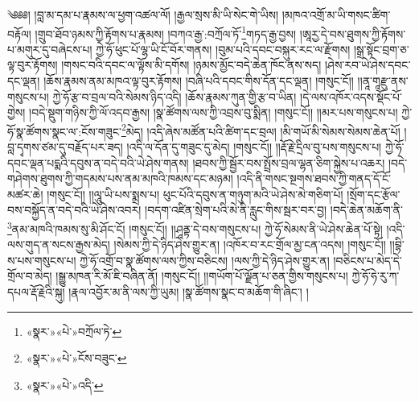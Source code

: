 ༄༅༅། །བླ་མ་དམ་པ་རྣམས་ལ་ཕྱག་འཚལ་ལོ། །རྒྱལ་སྲས་མི་ཡི་སེང་གེ་ཡིས། །མཁའ་འགྲོ་མ་ཡི་གསང་ཚིག་བརྟོལ། །གྲུབ་ཐོབ་ཉམས་ཀྱི་རྟོགས་པ་རྣམས། །བཀའ་རྒྱ་:བཀྲོལ་ཏོ་\footnote{«སྣར་»«པེ་»བཀྲོལ་ཏེ་}གཏད་རྒྱ་བྱས། །ཨཱརྱ་དེ་བས་ཐུགས་ཀྱི་རྟོགས་པ་མགུར་དུ་བཞེངས་པ། ཀྱེ་ཧོ་ཕུང་པོ་ལྷ་ཡི་ངོ་བོར་གནས། །བུམ་པའི་དབང་བསྐུར་རང་ལ་རྫོགས། །སྒྲ་སྟོང་བྲག་ཅ་ལྟ་བུར་རྟོགས། །གསང་བའི་དབང་ལ་ལྟོས་མི་དགོས། །ཉམས་མྱོང་བདེ་ཆེན་ཁོང་ནས་སད། །ཤེས་རབ་ཡེ་ཤེས་དབང་དང་ལྡན། །ཆོས་རྣམས་ནམ་མཁའ་ལྟ་བུར་རྟོགས། །བཞི་པའི་དབང་གིས་དོན་དང་ལྡན། །གསུང་ངོ།། །།ནཱ་གཱརྫུ་ནས་གསུངས་པ། ཀྱེ་ཧོ་རྩ་བ་བྲལ་བའི་སེམས་ཉིད་འདི། །ཆོས་རྣམས་ཀུན་གྱི་རྩ་བ་ཡིན། །དེ་ལས་འཁོར་འདས་སྡོང་པོ་གྱེས། །བདེ་སྡུག་གཉིས་ཀྱི་ལོ་འདབ་རྒྱས། །སྣ་ཚོགས་ལས་ཀྱི་འབྲས་བུ་སྨིན། །གསུང་ངོ།། །།མར་པས་གསུངས་པ། ཀྱེ་ཧོ་སྣ་ཚོགས་སྣང་ལ་:ངོས་གཟུང་\footnote{«སྣར་»«པེ་»ངོས་བཟུང་}མེད། །འདི་ཞེས་མཚོན་པའི་ཚིག་དང་བྲལ། །མི་གཡོ་མི་སེམས་སེམས་ཆེན་པོ། །བླ་དྭགས་ཙམ་དུ་བརྗོད་པར་ཟད། །འདི་ལ་དོན་དུ་གཟུང་དུ་མེད། །གསུང་ངོ།། །།རྡོ་རྗེ་དྲིལ་བུ་པས་གསུངས་པ། ཀྱེ་ཧོ་དབང་ལྡན་པདྨའི་དབུས་ན་བདེ་བའི་ཡེ་ཤེས་གནས། །ཐབས་ཀྱི་སྦྱོར་བས་སྤྲོས་བྲལ་ལྷན་ཅིག་སྐྱེས་པ་འཆར། །བདེ་གཤེགས་ཐུགས་ཀྱི་གདམས་པས་ནམ་མཁའི་ཁམས་དང་མཉམ། །འདི་ནི་གསང་སྔགས་ཐབས་ཀྱི་གནད་དོ་ངོ་མཚར་ཆེ། །གསུང་ངོ།། །།ལཱུ་ཡི་པས་སྨྲས་པ། ཕུང་པོའི་དབུས་ན་གཉུག་མའི་ཡེ་ཤེས་མེ་གཅིག་པོ། །སྲོག་དང་རྩོལ་བས་བསྐྱོད་ན་བདེ་བའི་ཡེ་ཤེས་འབར། །བདག་འཛིན་སྲེག་པའི་མེ་ནི་རླུང་གིས་སྦར་བར་བྱ། །བདེ་ཆེན་མཆོག་ནི་\footnote{«སྣར་»«པེ་»འདི་}ནམ་མཁའི་ཁམས་སུ་མི་ཤོང་ངོ། །གསུང་ངོ།། །།ཤཱནྟ་དེ་བས་གསུངས་པ། ཀྱེ་ཧོ་སེམས་ནི་ཡེ་ཤེས་ཆེན་པོ་སྟེ། །འདི་ལས་གུད་ན་སངས་རྒྱས་མེད། །སེམས་ཀྱི་དེ་ཉིད་ཤེས་གྱུར་ན། །འཁོར་བ་རང་གྲོལ་མྱ་ངན་འདས། །གསུང་ངོ།། །།བྷི་ས་པས་གསུངས་པ། ཀྱེ་ཧོ་འགྲོ་བ་སྣ་ཚོགས་ལས་ཀྱིས་བཅིངས། །ལས་ཀྱི་དེ་ཉིད་ཤེས་གྱུར་ན། །བཅིངས་པ་མེད་དེ་གྲོལ་བ་མེད། །སྒྱུ་མཁན་རི་མོ་ཇི་བཞིན་ནོ། །གསུང་ངོ།། །།གཡོག་པོ་ལྗོན་པ་ཅན་གྱིས་གསུངས་པ། ཀྱེ་ཧོ་ཧེ་རུ་ཀ་དཔལ་རྡོ་རྗེའི་སྐུ། །རྣལ་འབྱོར་མ་ནི་ལས་ཀྱི་ཡུམ། །སྣ་ཚོགས་སྣང་བ་མཆོག་གི་ཞིང་། །

